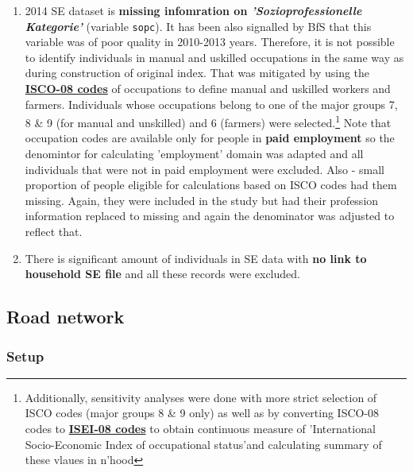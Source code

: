 \documentclass[a4paper, notitlepage, fleqn]{article} %
\begin{document}
{\begin{enumerate}
	\item 2014 SE dataset is \textbf{missing infomration on \textit{'Sozioprofessionelle Kategorie'}} (variable \texttt{sopc}).  
		It has been also signalled by BfS that this variable was of poor quality in 2010-2013 years. 
		Therefore, it is not possible to identify individuals in manual and uskilled occupations in the same way as during 
		construction of original index. That was mitigated by using the 
		\href{http://www.ilo.org/public/english/bureau/stat/isco/isco08/index.htm}{\textbf{ISCO-08 codes}} of occupations 
		to define manual and uskilled workers and farmers.
		Individuals whose occupations belong to one of the major groups 7, 8 \& 9 (for manual and unskilled) and 6 (farmers) were selected.\footnote{Additionally, 
		sensitivity analyses were done with more strict selection of ISCO codes (major groups 8 \& 9 only) as well as 	
		by converting ISCO-08 codes to \href{http://www.harryganzeboom.nl/isco08/qa-isei-08.htm}{\textbf{ISEI-08 codes}} 
		to obtain continuous measure of 'International Socio-Economic Index of occupational status'and calculating summary of these vlaues in n'hood} 				
		Note that occupation codes are available only for people in \textbf{paid employment} so the denomintor 
		for calculating 'employment' domain was adapted and all individuals that were not in paid employment were excluded.	
		Also - small proportion of people eligible for calculations based on ISCO codes had them missing. Again, they were included in the study
		but had their profession information replaced to missing and again the denominator was adjusted to reflect that.
		
	\item There is significant amount of individuals in SE data with \textbf{no link to household SE file} and all these records were excluded. 
	
\end{enumerate}
\newpage
\subsection{Road network}

\subsubsection{Setup}
\begin{enumerate}


\end{enumerate}}
\end{document}
